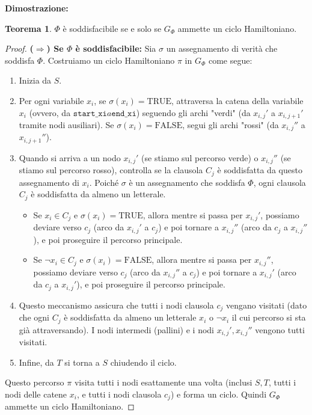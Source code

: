\documentclass[a4paper]{article}
\theoremstyle{definition} %
\newtheorem{theorem}{Teorema}
\begin{document}
\textbf{Dimostrazione:}
\begin{theorem}
$\Phi$ è soddisfacibile se e solo se $G_\Phi$ ammette un ciclo Hamiltoniano.
\end{theorem}
\begin{proof}
\textbf{($\Rightarrow$) Se $\Phi$ è soddisfacibile:}
Sia $\sigma$ un assegnamento di verità che soddisfa $\Phi$. Costruiamo un ciclo Hamiltoniano $\pi$ in $G_\Phi$ come segue:
\begin{enumerate}
    \item Inizia da $S$.
    \item Per ogni variabile $x_i$, se $\sigma(x_i) = \text{TRUE}$, attraversa la catena della variabile $x_i$ (ovvero, da $\texttt{start\_xi} a \texttt{end\_xi}$) seguendo gli archi "verdi" (da $x_{i,j}'$ a $x_{i,j+1}'$ tramite nodi ausiliari). Se $\sigma(x_i) = \text{FALSE}$, segui gli archi "rossi" (da $x_{i,j}''$ a $x_{i,j+1}''$).
    \item Quando si arriva a un nodo $x_{i,j}'$ (se stiamo sul percorso verde) o $x_{i,j}''$ (se stiamo sul percorso rosso), controlla se la clausola $C_j$ è soddisfatta da questo assegnamento di $x_i$. Poiché $\sigma$ è un assegnamento che soddisfa $\Phi$, ogni clausola $C_j$ è soddisfatta da almeno un letterale.
    \begin{itemize}
        \item Se $x_i \in C_j$ e $\sigma(x_i) = \text{TRUE}$, allora mentre si passa per $x_{i,j}'$, possiamo deviare verso $c_j$ (arco da $x_{i,j}'$ a $c_j$) e poi tornare a $x_{i,j}''$ (arco da $c_j$ a $x_{i,j}''$), e poi proseguire il percorso principale.
        \item Se $\neg x_i \in C_j$ e $\sigma(x_i) = \text{FALSE}$, allora mentre si passa per $x_{i,j}''$, possiamo deviare verso $c_j$ (arco da $x_{i,j}''$ a $c_j$) e poi tornare a $x_{i,j}'$ (arco da $c_j$ a $x_{i,j}'$), e poi proseguire il percorso principale.
    \end{itemize}
    \item Questo meccanismo assicura che tutti i nodi clausola $c_j$ vengano visitati (dato che ogni $C_j$ è soddisfatta da almeno un letterale $x_i$ o $\neg x_i$ il cui percorso si sta già attraversando). I nodi intermedi (pallini) e i nodi $x_{i,j}', x_{i,j}''$ vengono tutti visitati.
    \item Infine, da $T$ si torna a $S$ chiudendo il ciclo.
\end{enumerate}
Questo percorso $\pi$ visita tutti i nodi esattamente una volta (inclusi $S, T$, tutti i nodi delle catene $x_i$, e tutti i nodi clausola $c_j$) e forma un ciclo. Quindi $G_\Phi$ ammette un ciclo Hamiltoniano.


\end{proof}
\end{document}
